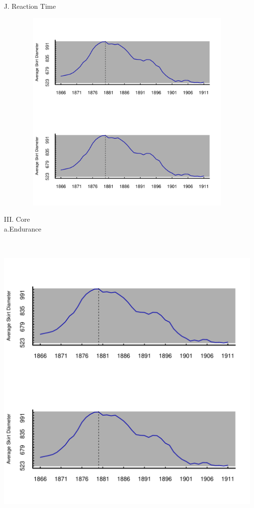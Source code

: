 \documentclass{article}\usepackage[]{graphicx}\usepackage[]{color}
\newenvironment{knitrout}{}{} %
\begin{document}
J. Reaction Time

\begin{knitrout}
\color{fgcolor}

\includegraphics[width=6in,height=4in]{figure/latex-unnamed-chunk-13-1} \hfill{}



\end{knitrout}

\newpage

III. Core\\
a.Endurance 
\begin{knitrout}
\color{fgcolor}

\includegraphics[width=6in,height=6in]{figure/latex-unnamed-chunk-14-1} \hfill{}



\end{knitrout}
\end{document}
